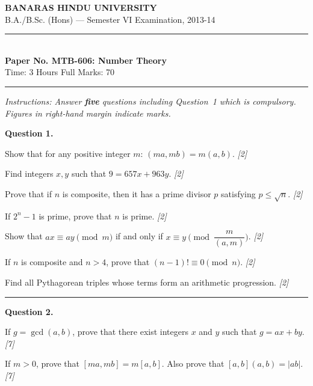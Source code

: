 \documentclass[11pt,a4paper]{article}
\newcommand{\pts}[1]{\hfill   \textit{[#1]}}
\begin{document}
\begin{center}
  {\large\bfseries BANARAS HINDU UNIVERSITY}\\[2pt]
  {\normalsize B.A./B.Sc. (Hons) --- Semester VI Examination, 2013-14}\\[6pt]
  \rule{0.8\linewidth}{0.5pt}\\[6pt]
  {\large\bfseries Paper No. MTB-606: Number Theory}\\[4pt]
  {\normalsize Time: 3 Hours \hfill Full Marks: 70}
\end{center}
\rule{\linewidth}{0.4pt}
\smallskip



\noindent   \textit{Instructions: Answer   \textbf{five} questions including Question~1 which is compulsory. Figures in right-hand margin indicate marks.}
\bigskip




\noindent   \textbf{Question 1.}

\begin{parts}
  \item Show that for any positive integer $m$: $(ma, mb) = m(a,b)$. \pts{2}
  \item Find integers $x, y$ such that $9 = 657x + 963y$. \pts{2}
  \item Prove that if $n$ is composite, then it has a prime divisor $p$ satisfying $p \le \sqrt{n}$. \pts{2}
  \item If $2^n - 1$ is prime, prove that $n$ is prime. \pts{2}
  \item Show that $ax \equiv ay \pmod{m}$ if and only if $x \equiv y \pmod{\dfrac{m}{(a,m)}}$. \pts{2}
  \item If $n$ is composite and $n > 4$, prove that $(n-1)! \equiv 0 \pmod{n}$. \pts{2}
  \item Find all Pythagorean triples whose terms form an arithmetic progression. \pts{2}
\end{parts}

\medskip\rule{\linewidth}{0.2pt}

\medskip


\noindent   \textbf{Question 2.}

\begin{parts}
  \item If $g = \gcd(a,b)$, prove that there exist integers $x$ and $y$ such that $g = ax + by$. \pts{7}
  \item If $m > 0$, prove that $[ma, mb] = m[a,b]$. Also prove that $[a,b](a,b) = |ab|$. \pts{7}
\end{parts}
\end{document}
